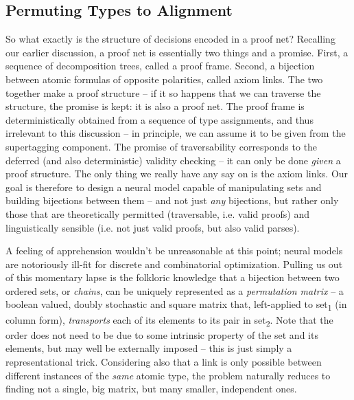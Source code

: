 \subsection{Permuting Types to Alignment}
So what exactly is the structure of decisions encoded in a proof net?
Recalling our earlier discussion, a proof net is essentially two things and a promise.
First, a sequence of decomposition trees, called a proof frame.
Second, a bijection between atomic formulas of opposite polarities, called axiom links.
The two together make a proof structure -- if it so happens that we can traverse the structure, the promise is kept: it is also a proof net.
The proof frame is deterministically obtained from a sequence of type assignments, and thus irrelevant to this discussion -- in principle, we can assume it to be given from the supertagging component.
The promise of traversability corresponds to the deferred (and also deterministic) validity checking -- it can only be done \textit{given} a proof structure.
The only thing we really have any say on is the axiom links.
Our goal is therefore to design a neural model capable of manipulating sets and building bijections between them -- and not just \textit{any} bijections, but rather only those that are theoretically permitted (traversable, i.e. valid proofs) and linguistically sensible (i.e. not just valid proofs, but also valid parses).

A feeling of apprehension wouldn't be unreasonable at this point; neural models are notoriously ill-fit for discrete and combinatorial optimization.
Pulling us out of this momentary lapse is the folkloric knowledge that a bijection between two ordered sets, or \textit{chains}, can be uniquely represented as a \textit{permutation matrix} -- a boolean valued, doubly stochastic and square matrix that, left-applied to set\textsubscript{1} (in column form), \textit{transports} each of its elements to its pair in set\textsubscript{2}.
Note that the order does not need to be due to some intrinsic property of the set and its elements, but may well be externally imposed -- this is just simply a representational trick.
Considering also that a link is only possible between different instances of the \textit{same} atomic type, the problem naturally reduces to finding not a single, big matrix, but many smaller, independent ones.

